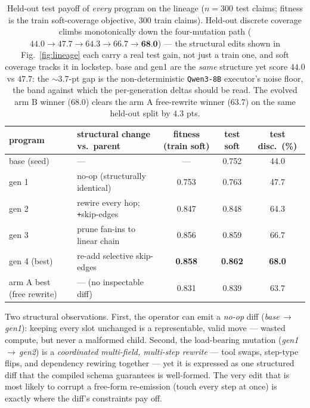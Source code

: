 \documentclass[11pt]{article}
\newcommand{\armA}{\textcolor{bad}{arm A}}
\newcommand{\armB}{\textcolor{accent}{arm B}}
\begin{document}
\begin{table}[H]\centering\small
\begin{tabular}{llccc}
\toprule
program & structural change vs.\ parent & fitness (train soft) & test soft & test disc.\ (\%) \\
\midrule
base (seed)     & ---                              & ---   & 0.752 & 44.0 \\
gen 1           & no-op (structurally identical)   & 0.753 & 0.763 & 47.7 \\
gen 2           & rewire every hop; \texttt{+}skip-edges & 0.847 & 0.848 & 64.3 \\
gen 3           & prune fan-ins to linear chain    & 0.856 & 0.859 & 66.7 \\
gen 4 (best)    & re-add selective skip-edges      & \textbf{0.858} & \textbf{0.862} & \textbf{\textcolor{good}{68.0}} \\
\midrule
\armA{} best (free rewrite) & --- (no inspectable diff) & 0.831 & 0.839 & 63.7 \\
\bottomrule
\end{tabular}
\caption{Held-out test payoff of \emph{every} program on the lineage ($n=300$ test claims; fitness
is the train soft-coverage objective, 300 train claims). Held-out discrete coverage climbs
monotonically down the four-mutation path ($44.0\to47.7\to64.3\to66.7\to\textbf{68.0}$) --- the
structural edits shown in Fig.~\ref{fig:lineage} each carry a real test gain, not just a train one,
and soft coverage tracks it in lockstep. base and gen1 are the \emph{same} structure yet score
$44.0$ vs $47.7$: the $\sim$3.7-pt gap is the non-deterministic \texttt{Qwen3-8B} executor's noise
floor, the band against which the per-generation deltas should be read. The evolved \armB{} winner
($68.0$) clears the \armA{} free-rewrite winner ($63.7$) on the same held-out split by $4.3$ pts.}
\label{tab:lineagetest}
\end{table}

\noindent Two structural observations. First, the operator can emit a \emph{no-op} diff
(\emph{base\,$\to$\,gen1}): keeping every slot unchanged is a representable, valid move --- wasted
compute, but never a malformed child. Second, the load-bearing mutation (\emph{gen1\,$\to$\,gen2})
is a \emph{coordinated multi-field, multi-step rewrite} --- tool swaps, step-type flips, and
dependency rewiring together --- yet it is expressed as one structured diff that the compiled
schema guarantees is well-formed. The very edit that is most likely to corrupt a free-form
re-emission (touch every step at once) is exactly where the diff's constraints pay off.
\end{document}
